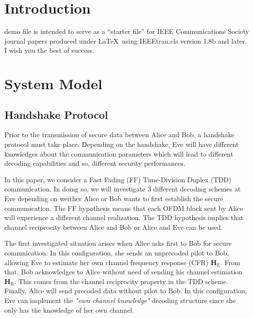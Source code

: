 \documentclass[journal,comsoc]{IEEEtran}
\newcommand{\HE}{\textbf{H}_{\text{E}}}
\newcommand{\HB}{\textbf{H}_{\text{B}}}
\begin{document}
\section{Introduction}
 demo file is intended to serve as a ``starter file''
for IEEE Communications Society journal papers produced under \LaTeX\ using
IEEEtran.cls version 1.8b and later.
I wish you the best of success.







\section{System Model}

\subsection{Handshake Protocol}
\label{sec:establishment}
Prior to the transmission of secure data between Alice and Bob, a handshake protocol must take place. Depending on the handshake, Eve will have different knowledges about the communication parameters which will lead to different decoding capabilities and so, different security performances. 

In this paper, we consider a Fast Fading (FF) Time-Division Duplex (TDD) communication. In doing so, we will investigate 3 different decoding schemes at Eve depending on weither Alice or Bob wants to first establish the secure communication. The FF hypothesis means that each OFDM block sent by Alice will experience a different channel realization. The TDD hypothesis implies that channel reciprocity between Alice and Bob or Alice and Eve can be used. 

The first investigated situation arises when Alice asks first to Bob for secure commnication. In this configuration, she sends an unprecoded pilot to Bob, allowing Eve to estimate her own channel frequency response (CFR) $\HE$. From that, Bob acknowledges to Alice without need of sending his channel estimation $\HB$. This comes from the channel reciprocity property in the TDD scheme. Finally, Alice will send precoded data without pilot to Bob. In this configuration, Eve can implement the \textit{"own channel knowledge"} decoding structure since she only has the knowledge of her own channel. 
\end{document}
